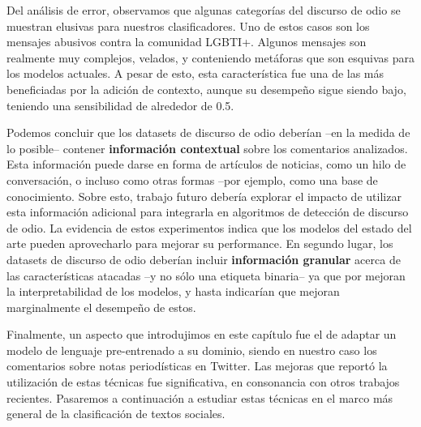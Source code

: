 Del análisis de error, observamos que algunas categorías del discurso de odio se muestran elusivas para nuestros clasificadores. Uno de estos casos son los mensajes abusivos contra la comunidad LGBTI+. Algunos mensajes son realmente muy complejos, velados, y conteniendo metáforas que son esquivas para los modelos actuales. A pesar de esto, esta característica fue una de las más beneficiadas por la adición de contexto, aunque su desempeño sigue siendo bajo, teniendo una sensibilidad de alrededor de 0.5.

Podemos concluir que los datasets de discurso de odio deberían --en la medida de lo posible-- contener \textbf{información contextual} sobre los comentarios analizados. Esta información puede darse en forma de artículos de noticias, como un hilo de conversación, o incluso como otras formas --por ejemplo, como una base de conocimiento. Sobre esto, trabajo futuro debería explorar el impacto de utilizar esta información adicional para integrarla en algoritmos de detección de discurso de odio. La evidencia de estos experimentos indica que los modelos del estado del arte pueden aprovecharlo para mejorar su performance. En segundo lugar, los datasets de discurso de odio deberían incluir \textbf{información granular} acerca de las características atacadas --y no sólo una etiqueta binaria-- ya que por mejoran la interpretabilidad de los modelos, y hasta indicarían que mejoran marginalmente el desempeño de estos.

Finalmente, un aspecto que introdujimos en este capítulo fue el de adaptar un modelo de lenguaje pre-entrenado a su dominio, siendo en nuestro caso los comentarios sobre notas periodísticas en Twitter. Las mejoras que reportó la utilización de estas técnicas fue significativa, en consonancia con otros trabajos recientes. Pasaremos a continuación a estudiar estas técnicas en el marco más general de la clasificación de textos sociales.